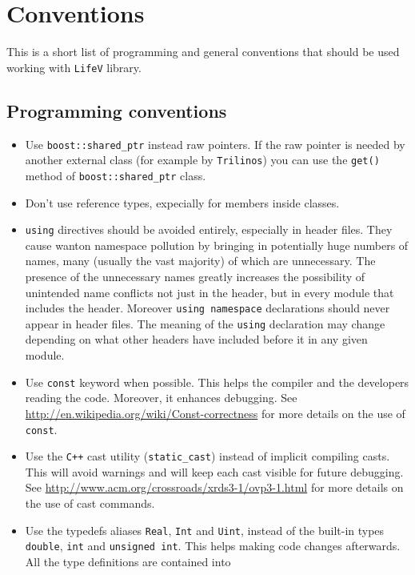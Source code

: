 \documentclass[a4paper]{article}
\begin{document}
\newpage
\section{Conventions}
This is a short list of programming and general conventions that should be used
working with \texttt{LifeV} library.

\subsection{Programming conventions}
\begin{itemize}
  \item Use \texttt{boost::shared\_ptr} instead raw pointers. If the raw
  pointer is needed by another external class (for example by \texttt{Trilinos})
  you can use the \texttt{get()} method of \texttt{boost::shared\_ptr} class.
  \item Don't use reference types, expecially for members inside classes.
  \item \texttt{using} directives should be avoided entirely, especially in
  header files. They cause wanton namespace pollution
  by bringing in potentially huge numbers of names, many (usually the vast
  majority) of which are unnecessary. The presence of the unnecessary names
  greatly increases the possibility of unintended name conflicts not just in
  the header, but in every module that includes the header. Moreover
  \texttt{using namespace} declarations should never appear in header files.
  The meaning of the \texttt{using} declaration may change depending on what
  other headers have included before it in any given module.
  \item Use \texttt{const} keyword when possible. This helps the compiler
  and the developers reading the code. Moreover, it enhances
  debugging. See \url{http://en.wikipedia.org/wiki/Const-correctness} for more
  details on the use of \texttt{const}.
  \item Use the \texttt{C++} cast utility (\texttt{static\_cast}) instead of
  implicit compiling casts. This will avoid warnings and will keep
  each cast visible for future debugging. See
  \url{http://www.acm.org/crossroads/xrds3-1/ovp3-1.html} for more details on
  the use of cast commands.
  \item Use the typedefs aliases \texttt{Real}, \texttt{Int} and
  \texttt{Uint}, instead of the built-in types \texttt{double},
  \texttt{int} and \texttt{unsigned int}. This helps making code
  changes afterwards. All the type definitions are contained into

\end{itemize}
\end{document}
